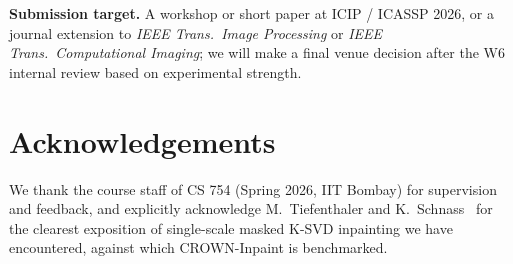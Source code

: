 \documentclass[11pt,a4paper]{article}
\theoremstyle{definition}
\theoremstyle{remark}
\begin{document}
\noindent\textbf{Submission target.} A workshop or short paper at
ICIP / ICASSP 2026, or a journal extension to \emph{IEEE Trans.\ Image
Processing} or \emph{IEEE Trans.\ Computational Imaging}; we will
make a final venue decision after the W6 internal review based on
experimental strength.

\section*{Acknowledgements}
We thank the course staff of CS 754 (Spring 2026, IIT Bombay) for
supervision and feedback, and explicitly acknowledge
M.~Tiefenthaler and K.~Schnass~\cite{tiefenthaler2018thesis} for the
clearest exposition of single-scale masked K-SVD inpainting we have
encountered, against which CROWN-Inpaint is benchmarked.
\end{document}
